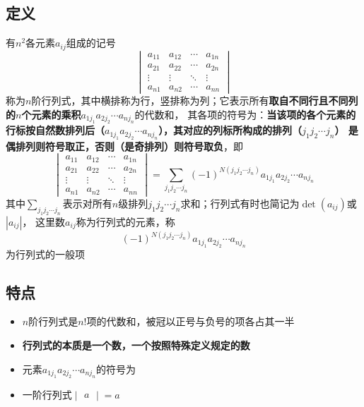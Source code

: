 \documentclass[UTF8]{ctexart}
\newcommand{\abs}[1]{{\left|{#1}\right|}}
\begin{document}
\subsection*{定义}
有$n^2$各元素$a_{ij}$组成的记号
\[\begin{vmatrix}
a_{11}&a_{12}&\cdots&a_{1n}\\
a_{21}&a_{22}&\cdots&a_{2n}\\
\vdots&\vdots&\ddots&\vdots\\
a_{n1}&a_{n2}&\cdots&a_{nn}
\end{vmatrix}\]
称为$n$阶行列式，其中横排称为行，竖排称为列；它表示所有\textbf{取自不同行且不同列的$n$个元素的乘积$a_{1j_1}a_{2j_2}\cdots a_{nj_n}$}的代数和，
其各项的符号为：\textbf{当该项的各个元素的行标按自然数排列后（$a_{1j_1}a_{2j_2}\cdots a_{nj_n}$），其对应的列标所构成的排列（$j_1j_2\cdots j_n$）
是偶排列则符号取正，否则（是奇排列）则符号取负}，即
\[\begin{vmatrix}
a_{11}&a_{12}&\cdots&a_{1n}\\
a_{21}&a_{22}&\cdots&a_{2n}\\
\vdots&\vdots&\ddots&\vdots\\
a_{n1}&a_{n2}&\cdots&a_{nn}
\end{vmatrix}=
\sum_{j_1j_2\cdots j_n}(-1)^{N(j_1j_2\cdots j_n)}a_{1j_1}a_{2j_2}\cdots a_{nj_n}
\]
其中$\displaystyle\sum_{j_1j_2\cdots j_n}$表示对所有$n$级排列$j_1j_2\cdots j_n$求和；行列式有时也简记为$\det(a_{ij})$或$\abs{a_{ij}}$，
这里数$a_{ij}$称为行列式的元素，称
\[(-1)^{N(j_1j_2\cdots j_n)}a_{1j_1}a_{2j_2}\cdots a_{nj_n}\]
为行列式的一般项

\subsection*{特点}
\begin{itemize}
  \item $n$阶行列式是$n!$项的代数和，被冠以正号与负号的项各占其一半
  \item \textbf{行列式的本质是一个数，一个按照特殊定义规定的数}
  \item 元素$a_{1j_1}a_{2j_2}\cdots a_{nj_n}$的符号为
  \item 一阶行列式$\begin{vmatrix}a\end{vmatrix}=a$
\end{itemize}
\end{document}
